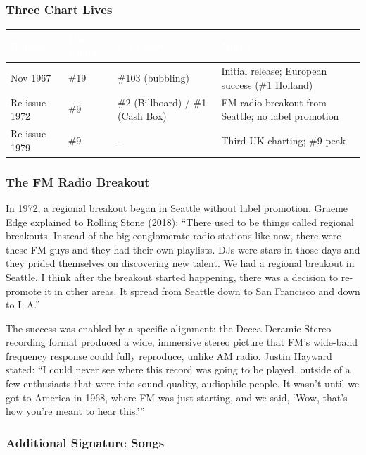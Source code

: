 \documentclass[11pt,letterpaper]{article}
\newcommand{\tableheader}[1]{\textbf{\sffamily\textcolor{white}{#1}}}
\begin{document}
\subsubsection{Three Chart Lives}

\begin{center}
\begin{tabularx}{\textwidth}{C{2cm}C{2cm}C{2.5cm}X}
\toprule
{}
\tableheader{Release} & \tableheader{UK Chart} & \tableheader{US Chart} & \tableheader{Notes} \\
\midrule
Nov 1967 & \#19 & \#103 (bubbling) & Initial release; European success (\#1 Holland) \\
Re-issue 1972 & \#9 & \#2 (Billboard) / \#1 (Cash Box) & FM radio breakout from Seattle; no label promotion \\
Re-issue 1979 & \#9 & \--- & Third UK charting; \#9 peak \\
\bottomrule
\end{tabularx}
\end{center}

\subsubsection{The FM Radio Breakout}

In 1972, a regional breakout began in Seattle without label promotion. Graeme Edge explained to Rolling Stone (2018): ``There used to be things called regional breakouts. Instead of the big conglomerate radio stations like now, there were these FM guys and they had their own playlists. DJs were stars in those days and they prided themselves on discovering new talent. We had a regional breakout in Seattle. I think after the breakout started happening, there was a decision to re-promote it in other areas. It spread from Seattle down to San Francisco and down to L.A.''

The success was enabled by a specific alignment: the Decca Deramic Stereo recording format produced a wide, immersive stereo picture that FM's wide-band frequency response could fully reproduce, unlike AM radio. Justin Hayward stated: ``I could never see where this record was going to be played, outside of a few enthusiasts that were into sound quality, audiophile people. It wasn't until we got to America in 1968, where FM was just starting, and we said, `Wow, that's how you're meant to hear this.'''

\subsubsection{Additional Signature Songs}
\end{document}
